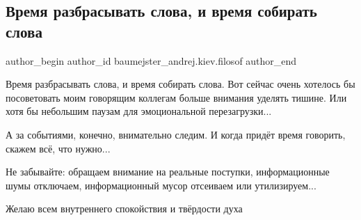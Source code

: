  
 
 
 
 
 
\subsection{Время разбрасывать слова, и время собирать слова}
\label{sec:25_01_2022.fb.baumejster_andrej.kiev.filosof.1.vremja_sobirat_slova}
 
\ifcmt
 author_begin
   author_id baumejster_andrej.kiev.filosof
 author_end
\fi

Время разбрасывать слова, и время собирать слова. Вот сейчас очень хотелось бы
посоветовать моим говорящим коллегам больше внимания уделять тишине. Или хотя
бы небольшим паузам для эмоциональной перезагрузки...

А за событиями, конечно, внимательно следим. И когда придёт время говорить,
скажем всё, что нужно...

Не забывайте: обращаем внимание на реальные поступки, информационные шумы
отключаем, информационный мусор отсеиваем или утилизируем...

Желаю всем внутреннего спокойствия и твёрдости духа

